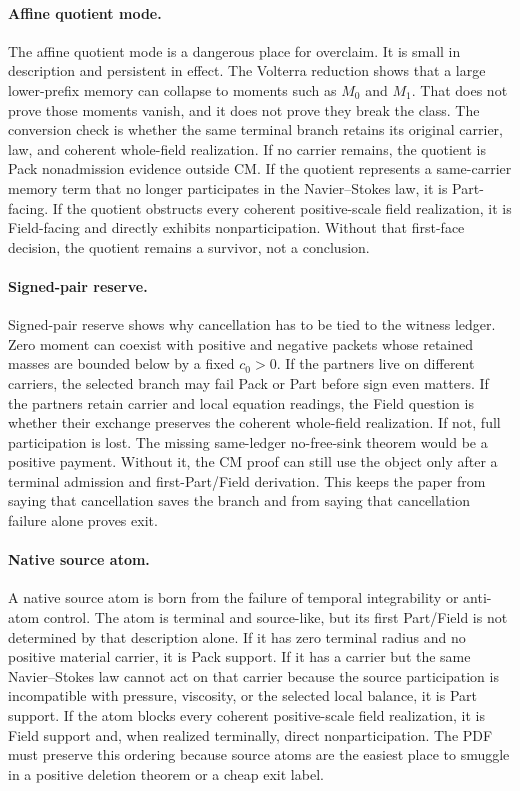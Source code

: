 \paragraph{Affine quotient mode.}
The affine quotient mode is a dangerous place for overclaim.
It is small in description and persistent in effect.
The Volterra reduction shows that a large lower-prefix memory can collapse to
moments such as \(M_0\) and \(M_1\).
That does not prove those moments vanish, and it does not prove they break the
class.
The conversion check is whether the same terminal branch retains its original
carrier, law, and coherent whole-field realization.
If no carrier remains, the quotient is Pack nonadmission evidence outside CM.
If the quotient represents a same-carrier memory term that no longer
participates in the Navier--Stokes law, it is Part-facing.
If the quotient obstructs every coherent positive-scale field realization, it
is Field-facing and directly exhibits nonparticipation.
Without that first-face decision, the quotient remains a survivor, not a
conclusion.

\paragraph{Signed-pair reserve.}
Signed-pair reserve shows why cancellation has to be tied to the witness
ledger.
Zero moment can coexist with positive and negative packets whose retained
masses are bounded below by a fixed \(c_0>0\).
If the partners live on different carriers, the selected branch may fail Pack
or Part before sign even matters.
If the partners retain carrier and local equation readings, the Field question
is whether their exchange preserves the coherent whole-field realization.  If
not, full participation is lost.
The missing same-ledger no-free-sink theorem would be a positive payment.
Without it, the CM proof can still use the object only after a terminal
admission and first-Part/Field derivation.
This keeps the paper from saying that cancellation saves the branch and from
saying that cancellation failure alone proves exit.

\paragraph{Native source atom.}
A native source atom is born from the failure of temporal integrability or
anti-atom control.
The atom is terminal and source-like, but its first Part/Field is not determined by
that description alone.
If it has zero terminal radius and no positive material carrier, it is Pack
support.
If it has a carrier but the same Navier--Stokes law cannot act on that carrier
because the source participation is incompatible with pressure, viscosity, or
the selected local balance, it is Part support.
If the atom blocks every coherent positive-scale field realization, it is
Field support and, when realized terminally, direct nonparticipation.
The PDF must preserve this ordering because source atoms are the easiest place
to smuggle in a positive deletion theorem or a cheap exit label.

